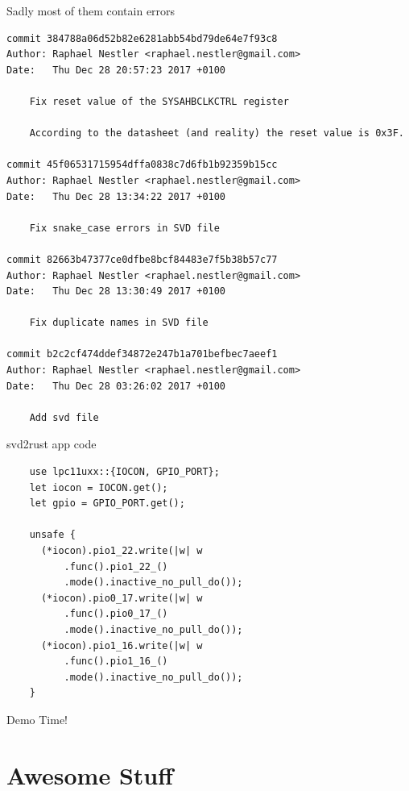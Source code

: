 \documentclass[aspectratio=1610,14pt,t]{beamer}
\begin{document}
\begin{frame}[c,fragile]{Sadly most of them contain errors}
  \begin{verbatim}
commit 384788a06d52b82e6281abb54bd79de64e7f93c8
Author: Raphael Nestler <raphael.nestler@gmail.com>
Date:   Thu Dec 28 20:57:23 2017 +0100

    Fix reset value of the SYSAHBCLKCTRL register

    According to the datasheet (and reality) the reset value is 0x3F.

commit 45f06531715954dffa0838c7d6fb1b92359b15cc
Author: Raphael Nestler <raphael.nestler@gmail.com>
Date:   Thu Dec 28 13:34:22 2017 +0100

    Fix snake_case errors in SVD file

commit 82663b47377ce0dfbe8bcf84483e7f5b38b57c77
Author: Raphael Nestler <raphael.nestler@gmail.com>
Date:   Thu Dec 28 13:30:49 2017 +0100

    Fix duplicate names in SVD file

commit b2c2cf474ddef34872e247b1a701befbec7aeef1
Author: Raphael Nestler <raphael.nestler@gmail.com>
Date:   Thu Dec 28 03:26:02 2017 +0100

    Add svd file
  \end{verbatim}
\end{frame}

\begin{frame}[c,fragile]{svd2rust app code}
  \begin{verbatim}
    use lpc11uxx::{IOCON, GPIO_PORT};
    let iocon = IOCON.get();
    let gpio = GPIO_PORT.get();

    unsafe {
      (*iocon).pio1_22.write(|w| w
          .func().pio1_22_()
          .mode().inactive_no_pull_do());
      (*iocon).pio0_17.write(|w| w
          .func().pio0_17_()
          .mode().inactive_no_pull_do());
      (*iocon).pio1_16.write(|w| w
          .func().pio1_16_()
          .mode().inactive_no_pull_do());
    }
  \end{verbatim}
\end{frame}

\begin{frame}[c]{Demo Time!}
\end{frame}

\section{Awesome Stuff}
\end{document}
